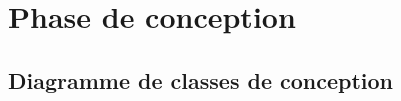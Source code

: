 \section[Phase de conception]{Phase de conception}
    \subsection[Diagramme de classes de conception]{Diagramme de classes de conception}